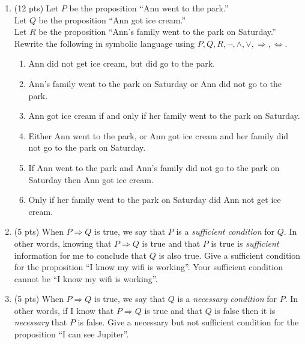 \documentclass[14pt]{extarticle}
\begin{document}
\begin{enumerate}
\item (12 pts) Let $P$ be the proposition ``Ann went to the park.'' \\Let $Q$ be the proposition ``Ann got ice cream.'' \\
Let $R$ be the proposition ``Ann's family went to the park on Saturday.''\\Rewrite the following in symbolic language using $P, Q, R, \neg, \land, \lor, \Rightarrow, \Leftrightarrow$.
\begin{enumerate}
\item Ann did not get ice cream, but did go to the park.
\item Ann's family went to the park on Saturday or Ann did not go to the park.
\item Ann got ice cream if and only if her family went to the park on Saturday.
\item Either Ann went to the park, or Ann got ice cream and her family did not go to the park on Saturday.
\item If Ann went to the park and Ann's family did not go to the park on Saturday then Ann got ice cream.
\item Only if her family went to the park on Saturday did Ann not get ice cream.
\end{enumerate}

\item (5 pts) When $P \Rightarrow Q$ is true, we say that $P$ is a \textit{sufficient condition} for $Q$. In other words, knowing that $P \Rightarrow Q$ is true and that $P$ is true is \emph{sufficient} information for me to conclude that $Q$ is also true. Give a sufficient condition for the proposition ``I know my wifi is working''. Your sufficient condition cannot be ``I know my wifi is working''.

\item (5 pts) When $P \Rightarrow Q$ is true, we say that $Q$ is a \textit{necessary condition} for $P$. In other words, if I know that $P \Rightarrow Q$ is true and that $Q$ is false then it is \textit{necessary} that $P$ is false. Give a necessary but not sufficient condition for the proposition ``I can see Jupiter''.


\end{enumerate}
\end{document}
